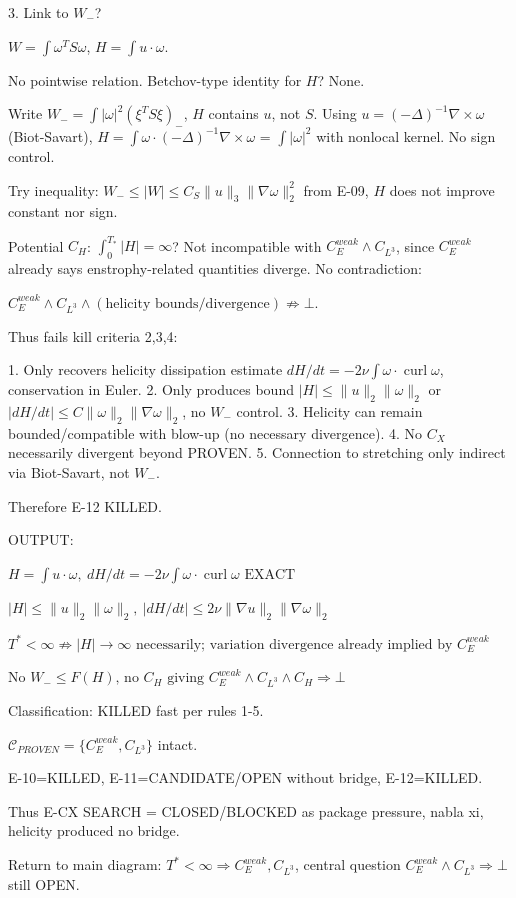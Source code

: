\documentclass[11pt]{article}
\begin{document}
3. Link to $W_-$?

$W=\int\omega^T S\omega$, $H=\int u\cdot\omega$.

No pointwise relation. Betchov-type identity for $H$? None.

Write $W_-=\int|\omega|^2(\xi^T S\xi)_-$, $H$ contains $u$, not $S$. Using $u=(-\Delta)^{-1}\nabla\times\omega$ (Biot-Savart), $H=\int\omega\cdot(-\Delta)^{-1}\nabla\times\omega$ = $\int |\omega|^2$ with nonlocal kernel. No sign control.

Try inequality: $W_-\le |W|\le C_S\|u\|_3\|\nabla\omega\|_2^2$ from E-09, $H$ does not improve constant nor sign.

Potential $C_H$: $\int_0^{T_*}|H|=\infty$? Not incompatible with $C_E^{weak}\land C_{L^3}$, since $C_E^{weak}$ already says enstrophy-related quantities diverge. No contradiction:

$\boxed{C_E^{weak}\land C_{L^3}\land (\text{helicity bounds/divergence}) \not\Rightarrow\bot}$.

Thus fails kill criteria 2,3,4:

1. Only recovers helicity dissipation estimate $dH/dt=-2\nu\int\omega\cdot\operatorname{curl}\omega$, conservation in Euler.
2. Only produces bound $|H|\le\|u\|_2\|\omega\|_2$ or $|dH/dt|\le C\|\omega\|_2\|\nabla\omega\|_2$, no $W_-$ control.
3. Helicity can remain bounded/compatible with blow-up (no necessary divergence).
4. No $C_X$ necessarily divergent beyond PROVEN.
5. Connection to stretching only indirect via Biot-Savart, not $W_-$.

Therefore E-12 KILLED.

OUTPUT:

$\boxed{H=\int u\cdot\omega,\ dH/dt=-2\nu\int\omega\cdot\operatorname{curl}\omega\text{ EXACT}}$

$\boxed{|H|\le\|u\|_2\|\omega\|_2,\ |dH/dt|\le2\nu\|\nabla u\|_2\|\nabla\omega\|_2}$

$\boxed{T^*<\infty\not\Rightarrow|H|\to\infty\text{ necessarily; variation divergence already implied by }C_E^{weak}}$

$\boxed{\text{No }W_-\le F(H)\text{, no }C_H\text{ giving }C_E^{weak}\land C_{L^3}\land C_H\Rightarrow\bot}$

Classification: KILLED fast per rules 1-5.

$\mathcal{C}_{PROVEN}=\{C_E^{weak},C_{L^3}\}$ intact.

E-10=KILLED, E-11=CANDIDATE/OPEN without bridge, E-12=KILLED.

Thus E-CX SEARCH = CLOSED/BLOCKED as package {pressure, nabla xi, helicity} produced no bridge.

Return to main diagram: $T^*<\infty\Rightarrow C_E^{weak},C_{L^3}$, central question $C_E^{weak}\land C_{L^3}\Rightarrow\bot$ still OPEN.
\end{document}
